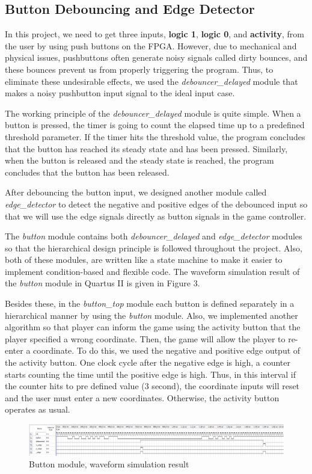 \documentclass[conference]{IEEEtran}
\begin{document}
\subsection{Button Debouncing and Edge Detector}
In this project, we need to get three inputs, \textbf{logic 1}, \textbf{logic 0}, and \textbf{activity}, from the user by using push buttons on the FPGA. However, due to mechanical and physical issues, pushbuttons often generate noisy signals called dirty bounces, and these bounces prevent us from properly triggering the program. Thus, to eliminate these undesirable effects, we used the \textit{debouncer\_delayed} module that makes a noisy pushbutton input signal to the ideal input case. \\
\par The working principle of the \textit{debouncer\_delayed} module is quite simple. When a button is pressed, the timer is going to count the elapsed time up to a predefined threshold parameter. If the timer hits the threshold value, the program concludes that the button has reached its steady state and has been pressed. Similarly, when the button is released and the steady state is reached, the program concludes that the button has been released. \\
\par After debouncing the button input, we designed another module called \textit{edge\_detector} to detect the negative and positive edges of the debounced input so that we will use the edge signals directly as button signals in the game controller. \\
\par The \textit{button} module contains both \textit{debouncer\_delayed} and \textit{edge\_detector} modules so that the hierarchical design principle is followed throughout the project. Also, both of these modules, are written like a state machine to make it easier to implement condition-based and flexible code. The waveform simulation result of the \textit{button} module in Quartus II is given in Figure 3. \\
\par Besides these, in the \textit{button\_top} module each button is defined separately in a hierarchical manner by using the \textit{button} module. Also, we implemented another algorithm so that player can inform the game using the activity button that the player specified a wrong coordinate. Then, the game will allow the player to re-enter a coordinate. To do this, we used the negative and positive edge output of the activity button. One clock cycle after the negative edge is high, a counter starts counting the time until the positive edge is high. Thus, in this interval if the counter hits to pre defined value (3 second), the coordinate inputs will reset and the user must enter a new coordinates. Otherwise, the activity button operates as usual. 
 \begin{figure}[H]
   \centerline{\includegraphics[scale=0.22]{simulation.png}}
    \caption{Button module, waveform simulation result}
\end{figure} 
\end{document}
